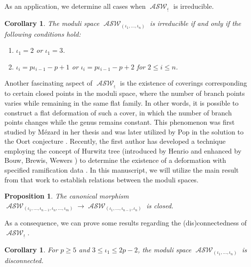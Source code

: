 \documentclass{compositio}
\newcommand{\mat}[1]{\todo[color=green]{MH: #1}}
\newtheorem{proposition}[theorem]{Proposition}
\newtheorem{corollary}[theorem]{Corollary}
\theoremstyle{remark}
\theoremstyle{remark}
\DeclareMathOperator{\ASW}{\mathcal{ASW}}
\begin{document}
As an application, we determine all cases when $\ASW_{\underline{\iota}}$ is irreducible.

\begin{corollary}
The moduli space $\ASW_{(\iota_1, \ldots, \iota_n)}$ is irreducible if and only if the following conditions hold:
\begin{enumerate}[label*=\arabic*.]
\item $\iota_1 = 2$ or $\iota_1 = 3$.
\item $\iota_{i} = p\iota_{i-1}-p+1$ or $\iota_{i} = p\iota_{i-1}-p+2$ for $2 \leq i \leq n$.
\end{enumerate}
\end{corollary}



Another fascinating aspect of $\ASW_{\underline{\iota}}$ is the existence of coverings corresponding to certain closed points in the moduli space, where the number of branch points varies while remaining in the same flat family. In other words, it is possible to construct a flat deformation of such a cover, in which the number of branch points changes while the genus remains constant. This phenomenon was first studied by M{\'e}zard in her thesis \cite{MEZAR1998} and was later utilized by Pop in the solution to the Oort conjecture \cite{MR3194816}. Recently, the first author has developed a technique employing the concept of Hurwitz tree (introduced by Henrio \cite{2000math.....11098H} and enhanced by Bouw, Brewis, Wewers \cite{MR2254623} \cite{MR2534115}) to determine the existence of a deformation with specified ramification data \cite{2020arXiv200203719D, 2020arXiv201013614D}. In this manuscript, we will utilize the main result from that work to establish relations between the moduli spaces.
\begin{proposition}
    The canonical morphism $\ASW_{(\iota_1, \ldots, \iota_{n-1}, \iota_n, \ldots, \iota_m)} \xrightarrow{} \ASW_{(\iota_1, \ldots, \iota_{n-1}, \iota_n)}$ is closed.
\end{proposition}
As a consequence, we can prove some results regarding the (dis)connectedness of $\ASW_{\underline{\iota}}$.
\begin{corollary}
For $p \geq 5$ and $3 \leq \iota_1 \leq 2p-2$, the moduli space $\ASW_{(\iota_1, \ldots, \iota_n)}$ is disconnected.
\end{corollary}
\end{document}
